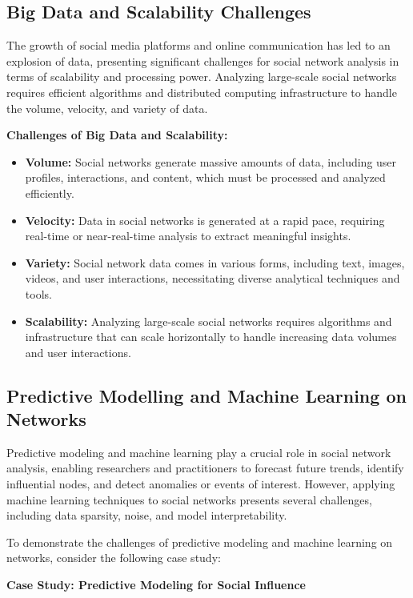 \documentclass[12pt]{book} %
\begin{document}
\subsection{Big Data and Scalability Challenges}

The growth of social media platforms and online communication has led to an explosion of data, presenting significant challenges for social network analysis in terms of scalability and processing power. Analyzing large-scale social networks requires efficient algorithms and distributed computing infrastructure to handle the volume, velocity, and variety of data.

\textbf{Challenges of Big Data and Scalability:}
\begin{itemize}
    \item \textbf{Volume:} Social networks generate massive amounts of data, including user profiles, interactions, and content, which must be processed and analyzed efficiently.
    \item \textbf{Velocity:} Data in social networks is generated at a rapid pace, requiring real-time or near-real-time analysis to extract meaningful insights.
    \item \textbf{Variety:} Social network data comes in various forms, including text, images, videos, and user interactions, necessitating diverse analytical techniques and tools.
    \item \textbf{Scalability:} Analyzing large-scale social networks requires algorithms and infrastructure that can scale horizontally to handle increasing data volumes and user interactions.
\end{itemize}

\subsection{Predictive Modelling and Machine Learning on Networks}

Predictive modeling and machine learning play a crucial role in social network analysis, enabling researchers and practitioners to forecast future trends, identify influential nodes, and detect anomalies or events of interest. However, applying machine learning techniques to social networks presents several challenges, including data sparsity, noise, and model interpretability.

To demonstrate the challenges of predictive modeling and machine learning on networks, consider the following case study:

\textbf{Case Study: Predictive Modeling for Social Influence}
\end{document}
